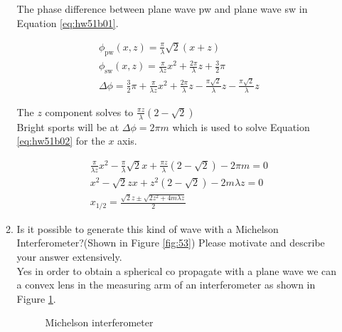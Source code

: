 \documentclass[main.tex]{subfiles}
\begin{document}
\begin{enumerate}
\begin{enumerate}
The phase difference between plane wave pw and plane wave sw in Equation \ref{eq:hw51b01}.

\begin{equation}\label{eq:hw51b01}
\begin{array}{l}
\phi_{\mathrm{pw}}(x,z)=\frac{\pi}{\lambda}\sqrt{2}(x+z)\\
\phi_{\mathrm{sw}}(x,z)=\frac{\pi}{\lambda z}x^2 + \frac{2\pi}{\lambda}z + \frac{3}{2}\pi\\
\Delta \phi = \frac{3}{2}\pi + \frac{\pi}{\lambda z}x^2 + \frac{2\pi}{\lambda}z - \frac{\pi \sqrt{2}}{\lambda}z - \frac{\pi \sqrt{2}}{\lambda}z
\end{array}
\end{equation}

The $z$ component solves to $\frac{\pi z}{\lambda}(2-\sqrt{2})$\\

Bright sports will be at $\Delta \phi = 2\pi m$ which is used to solve Equation \ref{eq:hw51b02} for the $x$ axis.

\begin{equation}\label{eq:hw51b02}
\begin{array}{l}
\frac{\pi}{\lambda z}x^2 - \frac{\pi}{\lambda}\sqrt{2}x + \frac{\pi z}{\lambda}(2-\sqrt{2}) - 2\pi m = 0\\
x^2 - \sqrt{2}zx + z^2(2-\sqrt{2}) - 2 m \lambda z = 0\\
x_{1/2}=\frac{\sqrt{2}z \pm \sqrt{2 z^2 + 4m \lambda z}}{2}
\end{array}
\end{equation}

\item{Is it possible to generate this kind of wave with a Michelson Interferometer?(Shown in Figure \ref{fig:53}) Please motivate and describe your answer extensively.}\\

Yes in order to obtain a spherical co propagate with a plane wave we can a convex lens in the measuring arm of an interferometer as shown in Figure \ref{fig:hw51c01}.\\

\begin{figure}
\centering{}
\caption{Michelson interferometer}
\label{fig:hw51c01}
\end{figure}


\end{enumerate}
\end{enumerate}
\end{document}
